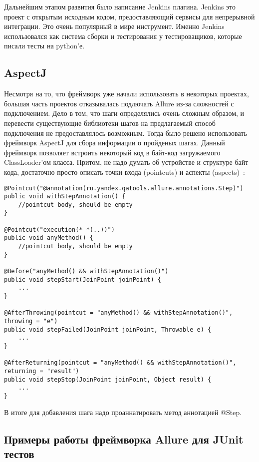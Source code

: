 Дальнейшим этапом развития было написание Jenkins плагина. Jenkins это проект с открытым исходным кодом, предоставляющий сервисы для непрерывной интеграции. Это очень популярный в мире инструмент. Именно Jenkins использовался как система сборки и тестирования у тестироващиков, которые писали тесты на python'е.  

\subsection{AspectJ}

Несмотря на то, что фреймворк уже начали использовать в некоторых проектах, большая часть проектов отказывалась подлючать Allure из-за сложностей с подключением. Дело в том, что шаги определялись очень сложным образом, и перевести существующие библиотеки шагов на предлагаемый способ подключения не предоставлялось возможным. Тогда было решено использовать фреймворк AspectJ для сбора информации о пройденых шагах. Данный фреймворк позволяет встроить некоторый код в байт-код загружаемого ClassLoader'ом класса. Притом, не надо думать об устройстве и структуре байт кода, достаточно просто описать  точки входа (pointcuts) и аспекты (aspects)~\cite{aspectj_cookbook}: 

\newpage
\begin{lstlisting}[caption=Пример описание точек входа и аспектов.]
@Pointcut("@annotation(ru.yandex.qatools.allure.annotations.Step)")
public void withStepAnnotation() {
    //pointcut body, should be empty
}

@Pointcut("execution(* *(..))")
public void anyMethod() {
    //pointcut body, should be empty
}

@Before("anyMethod() && withStepAnnotation()")
public void stepStart(JoinPoint joinPoint) {
    ...
}

@AfterThrowing(pointcut = "anyMethod() && withStepAnnotation()", throwing = "e")
public void stepFailed(JoinPoint joinPoint, Throwable e) {
    ...
}

@AfterReturning(pointcut = "anyMethod() && withStepAnnotation()", returning = "result")
public void stepStop(JoinPoint joinPoint, Object result) {
    ...
}
\end{lstlisting}


В итоге для добавления шага надо проаннатировать метод аннотацией @Step. 

\newpage
\subsection{Примеры работы фреймворка Allure для JUnit тестов}

